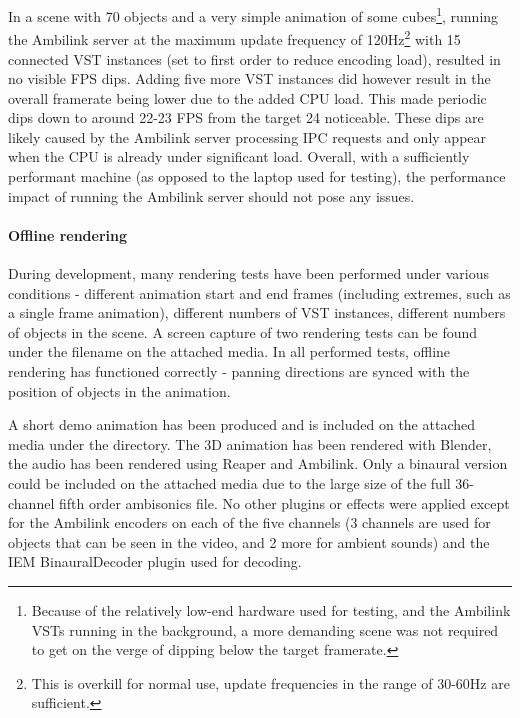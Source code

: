 In a scene with 70 objects and a very simple animation of some cubes\footnote{
    Because of the relatively low-end hardware used for testing, and the Ambilink VSTs running
    in the background, a more demanding scene was not 
    required to get on the verge of dipping below the target framerate.
},
running the Ambilink server at the maximum update frequency of 120Hz\footnote{
    This is overkill for normal use, update frequencies in the range of 30-60Hz are sufficient.
} 
with 15 connected VST instances (set to first order to reduce encoding load), 
resulted in no visible FPS dips. 
Adding five more VST instances did however result in the overall framerate 
being lower due to the added CPU load. This made periodic dips down to around 22-23 FPS from the target 24 noticeable.
These dips are likely caused by the Ambilink server processing IPC requests 
and only appear when the CPU is already under significant load.
Overall, with a sufficiently performant machine (as opposed to the laptop used for testing), 
the performance impact of running the Ambilink server should not pose any issues.

\paragraph*{Offline rendering}
During development, many rendering tests have been performed under various conditions - 
different animation start and end frames (including extremes, such as a single frame animation),
different numbers of VST instances, different numbers of objects in the scene. 
A screen capture of two rendering tests can be found under the filename 
on the attached media. 
In all performed tests, offline rendering has functioned correctly -
panning directions are synced with the position of objects in the animation.

A short demo animation has been produced and is included on the attached media 
under the  directory.
The 3D animation has been rendered with Blender, the audio has been rendered using Reaper and Ambilink.
Only a binaural version could be included on the attached media due to the large size of the full 36-channel fifth order ambisonics file.
No other plugins or effects were applied except for the Ambilink encoders on each of the five channels (3 channels are used for objects that can be seen in the video, and 2 more for ambient sounds)
and the IEM BinauralDecoder plugin used for decoding.

